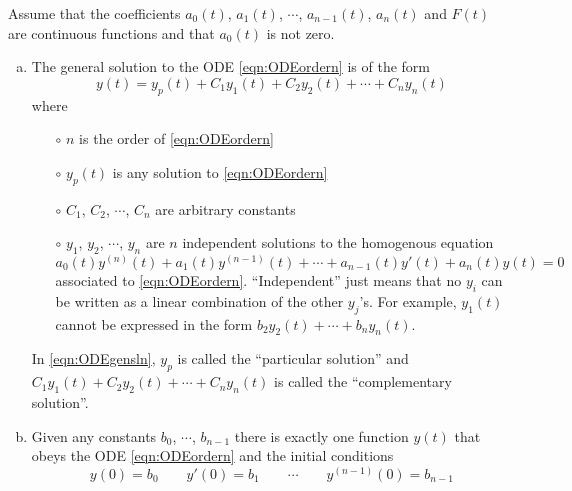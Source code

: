 \begin{theorem}\label{thm:odeMain}
Assume that the coefficients $a_0(t)$, $a_1(t)$, $\cdots$, $a_{n-1}(t)$, 
$a_n(t)$ and $F(t)$ are continuous functions and that 
$a_0(t)$ is not zero.

\begin{enumerate}[(a)]
\item %
The general solution to the ODE \eqref{eqn:ODEordern} is of the form
\begin{equation}\label{eqn:ODEgensln}
y(t)=y_p(t)+ C_1y_1(t)+C_2y_2(t)+\cdots+C_n y_n(t)
\end{equation}
where 
\begin{itemize}\itemsep1pt \parskip0pt  %
\item[$\circ$] $n$ is the order of \eqref{eqn:ODEordern}
\item[$\circ$] $y_p(t)$ is any solution to \eqref{eqn:ODEordern}
\item[$\circ$] $C_1$, $C_2$, $\cdots$, $C_n$ are arbitrary constants
\item[$\circ$] $y_1$, $y_2$, $\cdots$, $y_n$ are $n$ independent solutions
to the homogenous equation 
\begin{equation*}
a_0(t) y^{(n)}(t) + a_1(t) y^{(n-1)}(t)+\cdots+a_{n-1}(t) y'(t) +a_n(t)y(t)=0
\end{equation*}
associated to \eqref{eqn:ODEordern}.
``Independent'' just means that no $y_i$ can be written as a linear combination
of the other $y_j$'s. For example, $y_1(t)$ cannot be expressed in the form
$b_2y_2(t)+\cdots+b_ny_n(t)$. 
\end{itemize}
In \eqref{eqn:ODEgensln}, $y_p$ is called the ``particular solution'' and 
$C_1y_1(t)+C_2y_2(t)+\cdots+C_n y_n(t)$ is called the 
``complementary solution''.

\item %
Given any constants $b_0$, $\cdots$, $b_{n-1}$ there is exactly
one function $y(t)$ that obeys the ODE \eqref{eqn:ODEordern} and the initial
conditions
\begin{equation*}
y(0)=b_0\qquad y'(0)=b_1\qquad \cdots\qquad y^{(n-1)}(0)=b_{n-1}
\end{equation*}
\end{enumerate}
\end{theorem}

